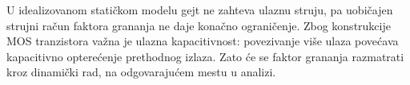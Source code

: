 U idealizovanom statičkom modelu gejt ne zahteva ulaznu struju, pa uobičajen strujni račun faktora grananja ne daje konačno ograničenje. Zbog konstrukcije MOS tranzistora važna je ulazna kapacitivnost: povezivanje više ulaza povećava kapacitivno opterećenje prethodnog izlaza. Zato će se faktor grananja razmatrati kroz dinamički rad, na odgovarajućem mestu u analizi.
